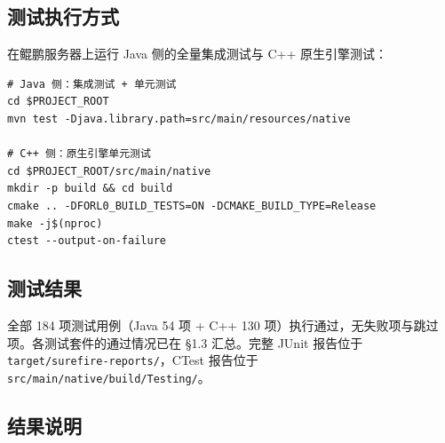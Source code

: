\documentclass[a4paper,11pt]{article}
\begin{document}
\subsection{测试执行方式}

在鲲鹏服务器上运行 Java 侧的全量集成测试与 C++ 原生引擎测试：

\begin{lstlisting}[language=shellcmd]
# Java 侧：集成测试 + 单元测试
cd $PROJECT_ROOT
mvn test -Djava.library.path=src/main/resources/native

# C++ 侧：原生引擎单元测试
cd $PROJECT_ROOT/src/main/native
mkdir -p build && cd build
cmake .. -DFORL0_BUILD_TESTS=ON -DCMAKE_BUILD_TYPE=Release
make -j$(nproc)
ctest --output-on-failure
\end{lstlisting}

\subsection{测试结果}

全部 184 项测试用例（Java 54 项 + C++ 130 项）执行通过，无失败项与跳过项。各测试套件的通过情况已在 \S1.3 汇总。完整 JUnit 报告位于 \texttt{target/surefire-reports/}，CTest 报告位于 \texttt{src/main/native/build/Testing/}。

\subsection{结果说明}
\end{document}
